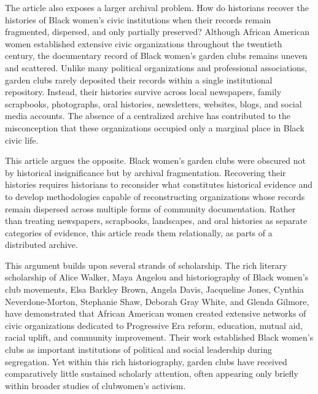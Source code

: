 \documentclass[final]{anthology-ch}
\begin{document}
The article also exposes a larger archival problem. How do historians recover the histories of Black women's civic institutions when their records remain fragmented, dispersed, and only partially preserved? Although African American women established extensive civic organizations throughout the twentieth century, the documentary record of Black women's garden clubs remains uneven and scattered. Unlike many political organizations and professional associations, garden clubs rarely deposited their records within a single institutional repository. Instead, their histories survive across local newspapers, family scrapbooks, photographs, oral histories, newsletters, websites, blogs, and social media accounts. The absence of a centralized archive has contributed to the misconception that these organizations occupied only a marginal place in Black civic life.

This article argues the opposite. Black women's garden clubs were obscured not by historical insignificance but by archival fragmentation. Recovering their histories requires historians to reconsider what constitutes historical evidence and to develop methodologies capable of reconstructing organizations whose records remain dispersed across multiple forms of community documentation. Rather than treating newspapers, scrapbooks, landscapes, and oral histories as separate categories of evidence, this article reads them relationally, as parts of a distributed archive.

This argument builds upon several strands of scholarship. The rich literary scholarship of Alice Walker, Maya Angelou and historiography of Black women's club movements, Elsa Barkley Brown, Angela Davis, Jacqueline Jones, Cynthia Neverdone-Morton, Stephanie Shaw, Deborah Gray White, and Glenda Gilmore, have demonstrated that African American women created extensive networks of civic organizations dedicated to Progressive Era reform, education, mutual aid, racial uplift, and community improvement. Their work established Black women's clubs as important institutions of political and social leadership during segregation. Yet within this rich historiography, garden clubs have received comparatively little sustained scholarly attention, often appearing only briefly within broader studies of clubwomen's activism.
\end{document}
